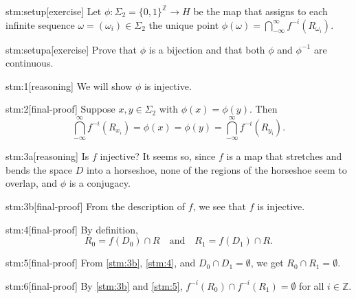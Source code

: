 
\begin{stm}{stm:setup}[exercise]
Let $\phi : \Sigma_2 = \{0,1\}^{\mathbb{Z}} \to H$ be the map that assigns to each infinite sequence $\omega = (\omega_i) \in \Sigma_2$ the unique point $\phi(\omega) = \bigcap_{-\infty}^\infty f^{-i}(R_{\omega_i})$.
\end{stm}

\begin{stm}{stm:setupa}[exercise]
Prove that $\phi$ is a bijection and that both $\phi$ and $\phi^{-1}$ are continuous.
\end{stm}


\begin{stm}{stm:1}[reasoning]
We will show $\phi$ is injective.
\end{stm}

\begin{stm}{stm:2}[final-proof]
Suppose $x, y \in \Sigma_2$ with $\phi(x) = \phi(y)$. Then 
\[
\bigcap_{-\infty}^\infty f^{-i}(R_{x_i}) = \phi(x) = \phi(y) = \bigcap_{-\infty}^\infty f^{-i}(R_{y_i}).
\]
\end{stm}

\begin{stm}{stm:3a}[reasoning]
Is $f$ injective? It seems so, since $f$ is a map that stretches and bends the space $D$ into a horseshoe, none of the regions of the horseshoe seem to overlap, and $\phi$ is a conjugacy.
\end{stm}

\begin{stm}{stm:3b}[final-proof]
From the description of $f$, we see that $f$ is injective.
\end{stm}

\begin{stm}{stm:4}[final-proof]
By definition,
\[
R_0 = f(D_0) \cap R \quad \text{and} \quad R_1 = f(D_1) \cap R.
\]
\end{stm}

\begin{stm}{stm:5}[final-proof]
From \ref{stm:3b}, \ref{stm:4}, and $D_0 \cap D_1 = \emptyset$, we get $R_0 \cap R_1 = \emptyset$.
\end{stm}

\begin{stm}{stm:6}[final-proof]
By \ref{stm:3b} and \ref{stm:5}, $f^{-i}(R_0) \cap f^{-i}(R_1) = \emptyset$ for all $i \in \mathbb{Z}$.
\end{stm}

